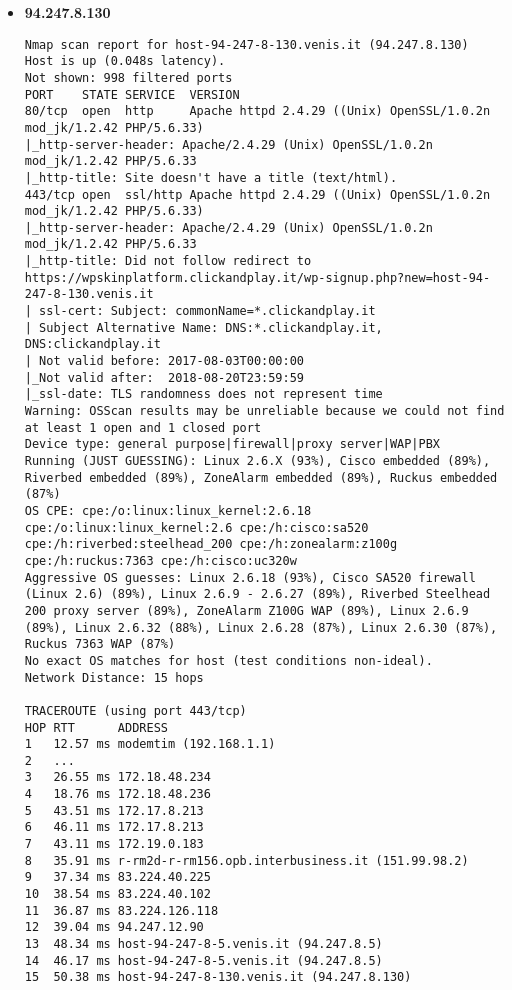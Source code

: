     \begin{itemize}
      \item \textbf{94.247.8.130}
          \begin{verbatim}
Nmap scan report for host-94-247-8-130.venis.it (94.247.8.130)
Host is up (0.048s latency).
Not shown: 998 filtered ports
PORT    STATE SERVICE  VERSION
80/tcp  open  http     Apache httpd 2.4.29 ((Unix) OpenSSL/1.0.2n mod_jk/1.2.42 PHP/5.6.33)
|_http-server-header: Apache/2.4.29 (Unix) OpenSSL/1.0.2n mod_jk/1.2.42 PHP/5.6.33
|_http-title: Site doesn't have a title (text/html).
443/tcp open  ssl/http Apache httpd 2.4.29 ((Unix) OpenSSL/1.0.2n mod_jk/1.2.42 PHP/5.6.33)
|_http-server-header: Apache/2.4.29 (Unix) OpenSSL/1.0.2n mod_jk/1.2.42 PHP/5.6.33
|_http-title: Did not follow redirect to https://wpskinplatform.clickandplay.it/wp-signup.php?new=host-94-247-8-130.venis.it
| ssl-cert: Subject: commonName=*.clickandplay.it
| Subject Alternative Name: DNS:*.clickandplay.it, DNS:clickandplay.it
| Not valid before: 2017-08-03T00:00:00
|_Not valid after:  2018-08-20T23:59:59
|_ssl-date: TLS randomness does not represent time
Warning: OSScan results may be unreliable because we could not find at least 1 open and 1 closed port
Device type: general purpose|firewall|proxy server|WAP|PBX
Running (JUST GUESSING): Linux 2.6.X (93%), Cisco embedded (89%), Riverbed embedded (89%), ZoneAlarm embedded (89%), Ruckus embedded (87%)
OS CPE: cpe:/o:linux:linux_kernel:2.6.18 cpe:/o:linux:linux_kernel:2.6 cpe:/h:cisco:sa520 cpe:/h:riverbed:steelhead_200 cpe:/h:zonealarm:z100g cpe:/h:ruckus:7363 cpe:/h:cisco:uc320w
Aggressive OS guesses: Linux 2.6.18 (93%), Cisco SA520 firewall (Linux 2.6) (89%), Linux 2.6.9 - 2.6.27 (89%), Riverbed Steelhead 200 proxy server (89%), ZoneAlarm Z100G WAP (89%), Linux 2.6.9 (89%), Linux 2.6.32 (88%), Linux 2.6.28 (87%), Linux 2.6.30 (87%), Ruckus 7363 WAP (87%)
No exact OS matches for host (test conditions non-ideal).
Network Distance: 15 hops

TRACEROUTE (using port 443/tcp)
HOP RTT      ADDRESS
1   12.57 ms modemtim (192.168.1.1)
2   ...
3   26.55 ms 172.18.48.234
4   18.76 ms 172.18.48.236
5   43.51 ms 172.17.8.213
6   46.11 ms 172.17.8.213
7   43.11 ms 172.19.0.183
8   35.91 ms r-rm2d-r-rm156.opb.interbusiness.it (151.99.98.2)
9   37.34 ms 83.224.40.225
10  38.54 ms 83.224.40.102
11  36.87 ms 83.224.126.118
12  39.04 ms 94.247.12.90
13  48.34 ms host-94-247-8-5.venis.it (94.247.8.5)
14  46.17 ms host-94-247-8-5.venis.it (94.247.8.5)
15  50.38 ms host-94-247-8-130.venis.it (94.247.8.130)


\end{verbatim}
\end{itemize}
